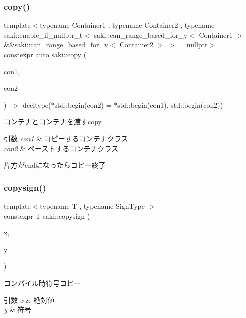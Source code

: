 \subsubsection{\texorpdfstring{copy()}{copy()}}
{\footnotesize\ttfamily template$<$typename Container1 , typename Container2 , typename saki\+::enable\+\_\+if\+\_\+nullptr\+\_\+t$<$ saki\+::can\+\_\+range\+\_\+based\+\_\+for\+\_\+v$<$ Container1 $>$ \&\&saki\+::can\+\_\+range\+\_\+based\+\_\+for\+\_\+v$<$ Container2 $>$ $>$  = nullptr$>$ \\
constexpr auto saki\+::copy (\begin{DoxyParamCaption}\item[{const Container1 \&}]{con1,  }\item[{Container2 \&}]{con2 }\end{DoxyParamCaption}) -\/$>$ decltype($\ast$std\+::begin(con2) = $\ast$std\+::begin(con1), std\+::begin(con2))
	}



コンテナとコンテナを渡すcopy 


\begin{DoxyParams}{引数}
{\em con1} & コピーするコンテナクラス \\
\hline
{\em con2} & ペーストするコンテナクラス\\
\hline
\end{DoxyParams}
片方がendになったらコピー終了 \mbox{\label{namespacesaki_a8bab6303ac2144b883080f04ebe26a0e}} 
\subsubsection{\texorpdfstring{copysign()}{copysign()}}
{\footnotesize\ttfamily template$<$typename T , typename Sign\+Type $>$ \\
constexpr T saki\+::copysign (\begin{DoxyParamCaption}\item[{const T \&}]{x,  }\item[{const Sign\+Type \&}]{y }\end{DoxyParamCaption})}



コンパイル時符号コピー 


\begin{DoxyParams}{引数}
{\em x} & 絶対値 \\
\hline
{\em y} & 符号 \\
\hline
\end{DoxyParams}
\mbox{\label{namespacesaki_a82551963a8cab889ca6f76ed346d6f4f}} 
